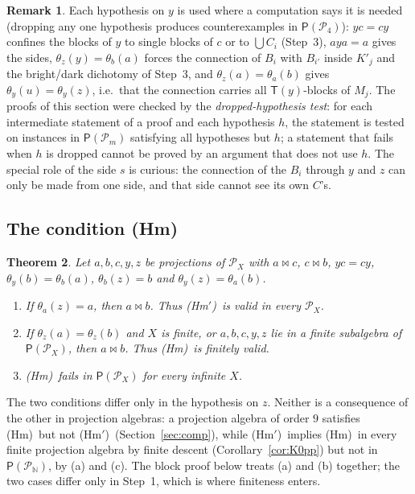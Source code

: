 \documentclass[11pt]{amsart}
\newtheorem{theorem}{Theorem}[section]
\theoremstyle{definition}
\newtheorem{remark}[theorem]{Remark}
\renewcommand{\P}{\mathcal{P}}      %
\newcommand{\PA}{\mathsf{P}}         %
\newcommand{\T}{\mathsf{T}}
\newcommand{\mt}{\bowtie}      %
\newcommand{\Kzero}{\textup{(Hm)}}     %
\newcommand{\Hmp}{\textup{(Hm$'$)}}     %
\begin{document}
\begin{remark}\label{rem:K4}
Each hypothesis on $y$ is used where a computation says it is needed (dropping any one hypothesis produces counterexamples in $\PA(\P_4)$): $yc=cy$ confines the blocks of $y$ to single blocks of $c$ or to $\bigcup C_i$ (Step~3), $aya=a$ gives the sides, $\theta_z(y)=\theta_b(a)$ forces the connection of $B_i$ with $B_{i'}$ inside $K'_j$ and the bright/dark dichotomy of Step~3, and $\theta_z(a)=\theta_a(b)$ gives $\theta_y(u)=\theta_y(z)$, i.e.\ that the connection carries all $\T(y)$-blocks of $M_j$. The proofs of this section were checked by the \emph{dropped-hypothesis test}: for each intermediate statement of a proof and each hypothesis $h$, the statement is tested on instances in $\PA(\P_m)$ satisfying all hypotheses but $h$; a statement that fails when $h$ is dropped cannot be proved by an argument that does not use $h$. The special role of the side $s$ is curious: the connection of the $B_i$ through $y$ and $z$ can only be made from one side, and that side cannot see its own $C$'s.
\end{remark}

\subsection{The condition \Kzero}\label{subsec:K0}

\begin{theorem}\label{thm:K0}
Let $a,b,c,y,z$ be projections of $\P_X$ with $a\mt c$, $c\mt b$, $yc=cy$, $\theta_y(b)=\theta_b(a)$, $\theta_b(z)=b$ and $\theta_y(z)=\theta_a(b)$.
\begin{enumerate}[label=\textup{(\alph*)},nosep]
\item If $\theta_a(z)=a$, then $a\mt b$. Thus \Hmp\ is valid in every $\P_X$.
\item If $\theta_z(a)=\theta_z(b)$ and $X$ is finite, or $a,b,c,y,z$ lie in a finite subalgebra of $\PA(\P_X)$, then $a\mt b$. Thus \Kzero\ is finitely valid.
\item \Kzero\ fails in $\PA(\P_X)$ for every infinite $X$.
\end{enumerate}
\end{theorem}

The two conditions differ only in the hypothesis on $z$. Neither is a consequence of the other in projection algebras: a projection algebra of order $9$ satisfies \Kzero\ but not \Hmp\ (Section~\ref{sec:comp}), while \Hmp\ implies \Kzero\ in every finite projection algebra by finite descent (Corollary~\ref{cor:K0pp}) but not in $\PA(\P_{\mathbb N})$, by (a) and (c). The block proof below treats (a) and (b) together; the two cases differ only in Step~1, which is where finiteness enters.
\end{document}
